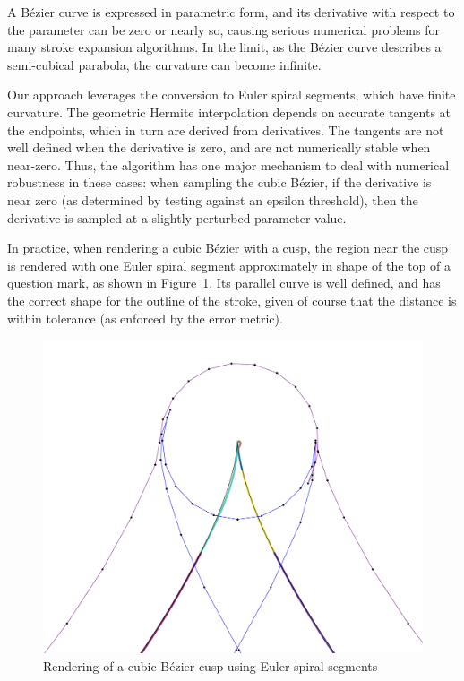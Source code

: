 \documentclass[sigconf, nonacm]{acmart}
\begin{document}
A Bézier curve is expressed in parametric form, and its derivative with respect to the parameter can be zero or nearly so, causing serious numerical problems for many stroke expansion algorithms. In the limit, as the Bézier curve describes a semi-cubical parabola, the curvature can become infinite.

Our approach leverages the conversion to Euler spiral segments, which have finite curvature. The geometric Hermite interpolation depends on accurate tangents at the endpoints, which in turn are derived from derivatives. The tangents are not well defined when the derivative is zero, and are not numerically stable when near-zero. Thus, the algorithm has one major mechanism to deal with numerical robustness in these cases: when sampling the cubic Bézier, if the derivative is near zero (as determined by testing against an epsilon threshold), then the derivative is sampled at a slightly perturbed parameter value.

In practice, when rendering a cubic Bézier with a cusp, the region near the cusp is rendered with one Euler spiral segment approximately in shape of the top of a question mark, as shown in Figure~\ref{fig:cusp_rendering}. Its parallel curve is well defined, and has the correct shape for the outline of the stroke, given of course that the distance is within tolerance (as enforced by the error metric).


\begin{figure}
    \includegraphics[scale=0.24]{cusp_rendering}
    \caption{Rendering of a cubic Bézier cusp using Euler spiral segments}
    \label{fig:cusp_rendering}
\end{figure}
\end{document}
